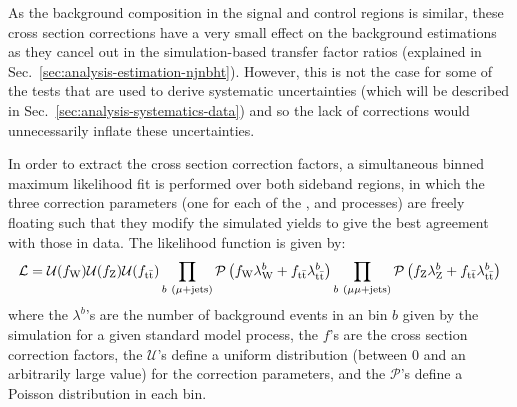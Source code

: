 

As the background composition in the signal and control regions is similar, 
these cross section corrections have a very small effect on the background 
estimations as they cancel out in the simulation-based transfer factor ratios 
(explained in 
Sec.~\ref{sec:analysis-estimation-njnbht}). However, this is not the case for 
some of the tests that are used to derive systematic uncertainties (which will 
be described in Sec.~\ref{sec:analysis-systematics-data}) and so the lack of 
corrections would unnecessarily inflate these uncertainties.


In order to extract the cross section correction factors, a simultaneous binned 
maximum likelihood fit is performed over both \mht sideband regions, in which 
the three correction parameters (one for each of the \zj, \wj and \ttbar 
processes) are freely floating such that they modify the simulated yields to 
give the best agreement with those in data. The likelihood function is given by:
\begin{equation}
\mathcal{L} = \mathcal{U}(f_{\mathrm W}) \mathcal{U}(f_{\mathrm Z}) 
\mathcal{U}(f_{\mathrm{t\bar{t}}}) 
\prod_{b~(\mu+\mathrm{jets})} 
\mathcal{P}\left(f_{\mathrm W} \lambda_{\mathrm W}^b + 
f_{\mathrm{t\bar{t}}} \lambda_{\mathrm{t\bar{t}}}^b\right) \prod_{b~(\mu\mu+\mathrm{jets})} 
\mathcal{P}\left(f_{\mathrm 
Z} \lambda_{\mathrm Z}^b + f_{\mathrm{t\bar{t}}} \lambda_{\mathrm{t\bar{t}}}^b\right)
\end{equation}
where the $\lambda^b$'s are the number of background events in an \njnbht bin 
$b$ given by the simulation for a given standard model process, the $f$'s are 
the cross section correction factors, the $\mathcal{U}$'s define a uniform 
distribution (between 0 and an arbitrarily large value) for the correction 
parameters, and the $\mathcal{P}$'s define a 
Poisson distribution in each bin. 


